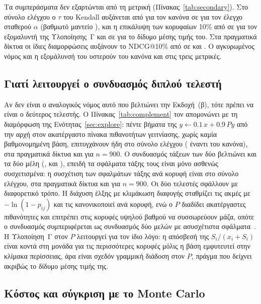 \documentclass[11pt,a4paper]{article}
\theoremstyle{definition}
\theoremstyle{plain}
\begin{document}
Τα συμπεράσματα δεν εξαρτώνται από τη μετρική (Πίνακας~\ref{tab:secondary}). Στο σύνολο ελέγχου ο $\tau$ του Kendall αυξάνεται από \SecTestRuleTau{} για τον κανόνα σε \SecTestLinNineTau{} για τον έλεγχο σταθερού $\alpha$ (βαθμωτό μαντείο \SecTestOracleScalarTau), και η επικάλυψη των κορυφαίων 10\% από \SecTestRuleTop{} σε \SecTestPBXbestTop{} για τον εξομαλυντή της Υλοποίησης~Γ και σε \SecTestCmeanTop{} για το δίδυμο μέσης τιμής του. Στα πραγματικά δίκτυα οι ίδιες διαμορφώσεις αυξάνουν το NDCG@10\% από \SecRealRuleNdcg{} σε \SecRealPBXbestNdcg{} και \SecRealCmeanNdcg. Ο αγκυρωμένος νόμος και η εξομάλυνσή του υστερούν του κανόνα και στις τρεις μετρικές.

\TabSecondary

\subsection{Γιατί λειτουργεί ο συνδυασμός διπλού τελεστή}\label{sec:complement}

Αν δεν είναι ο αναλογικός νόμος αυτό που βελτιώνει την Εκδοχή~(β), τότε πρέπει να είναι ο δεύτερος τελεστής. Ο Πίνακας~\ref{tab:complement} τον απομονώνει με τη διαμόρφωση της Ενότητας~\ref{sec:explore}: πέντε βήματα της $y\leftarrow0.1\,x+0.9\,Py$ από την αρχή στον ακατέργαστο πίνακα πιθανοτήτων γειτνίασης, χωρίς καμία βαθμονομημένη βάση, επιτυγχάνουν ήδη \RawPTest{} στο σύνολο ελέγχου (\RawPTestD{} έναντι του κανόνα), \RawPReal{} στα πραγματικά δίκτυα και \RawPScale{} για $n=900$. Ο συνδυασμός τάξεων των δύο βελτιώνει και τα δύο μέλη (\BlendTest, \BlendReal{} και \BlendScale), επειδή τα σφάλματα τάξης τους είναι μόνο ασθενώς συσχετισμένα: η συσχέτιση των σφαλμάτων τάξης ανά κορυφή είναι \ErrTest{} στο σύνολο ελέγχου, \ErrReal{} στα πραγματικά δίκτυα και \ErrScale{} για $n=900$. Οι δύο τελεστές σφάλλουν με διαφορετικό τρόπο. Η διάχυση έλξης με κλιμάκωση διαφυγής σταθμίζει τις ακμές με $-\ln(1-p_{ij})$ και τις κανονικοποιεί ανά κορυφή, ενώ ο $P$ διαδίδει ακατέργαστες πιθανότητες και επιτρέπει στις κορυφές υψηλού βαθμού να συσσωρεύουν μάζα, οπότε ο συνδυασμός συμπεριφέρεται ως συνδυασμός δύο μελών με ασυσχέτιστα σφάλματα~\cite{krogh95}. Η Υλοποίηση~Γ στον $P$ λειτουργεί για τον ίδιο λόγο: η απόσβεσή της $S_i/(x_i+S_i)$ είναι κοντά στη μονάδα για τις περισσότερες κορυφές μόλις η βάση εμφυτευτεί στην κλίμακα περίσσειας, άρα είναι σχεδόν γραμμική διάδοση στον $P$, πράγμα που δείχνει ακριβώς το δίδυμο μέσης τιμής της.

\TabComplement

\subsection{Κόστος και σύγκριση με το Monte Carlo}\label{sec:cost}
\end{document}
